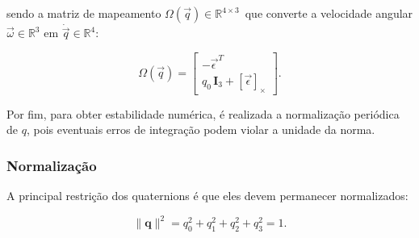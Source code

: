 
sendo a matriz de mapeamento
$\Omega(\vec{q})\in\mathbb{R}^{4\times 3}\,$
que converte a velocidade angular
$\vec{\omega}\in\mathbb{R}^{3}$
em
$\dot{\vec{q}}\in\mathbb{R}^{4}$:

\begin{equation}
    \label{eq:Omega_def}
\Omega(\vec{q})
=
\begin{bmatrix}
-\vec{\epsilon\,}^{T} \\[2pt]
q_0\,\mathbf{I}_3
+ [\vec{\epsilon}]_{\times}
\end{bmatrix}.
\end{equation}


Por fim, para obter estabilidade numérica, é realizada a normalização periódica de $q$, pois eventuais erros de integração podem violar a unidade da norma.

\subsubsection{Normalização}
A principal restrição dos quaternions é que eles devem permanecer normalizados:

\begin{equation}
\label{eq:normalizacao_quaternion}
\lVert \mathbf{q} \rVert^2 =
q_0^2
+ q_1^2
+ q_2^2
+ q_3^2
= 1.
\end{equation}

